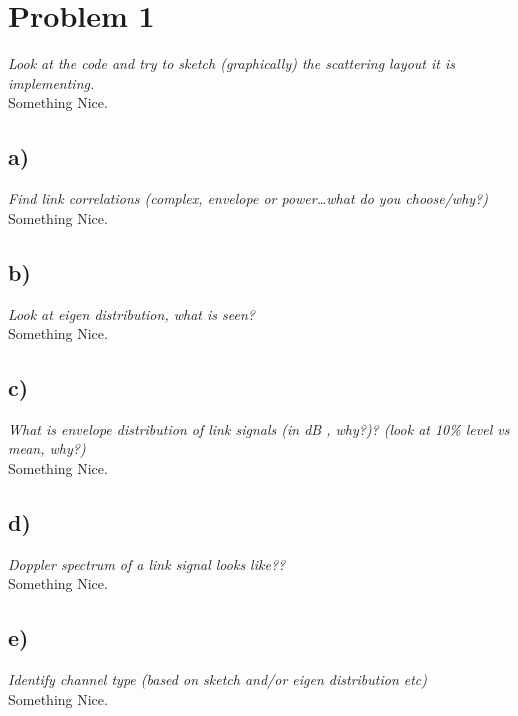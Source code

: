 \section{Problem 1}
\textit{Look at the code and try to sketch (graphically) the scattering layout it is implementing.}\\

Something Nice. 


\subsection{a)}
\textit{Find link correlations (complex, envelope or power…what do you choose/why?)}\\

Something Nice. 

\subsection{b)}
\textit{Look at eigen distribution, what is seen?}\\

Something Nice. 

\subsection{c)}
\textit{What is envelope distribution of link signals (in dB , why?)? (look at 10\% level vs mean, why?)}\\

Something Nice. 

\subsection{d)}
\textit{Doppler spectrum of a link signal looks like??}\\

Something Nice. 

\subsection{e)}
\textit{Identify channel type (based on sketch and/or eigen distribution etc)}\\

Something Nice. 